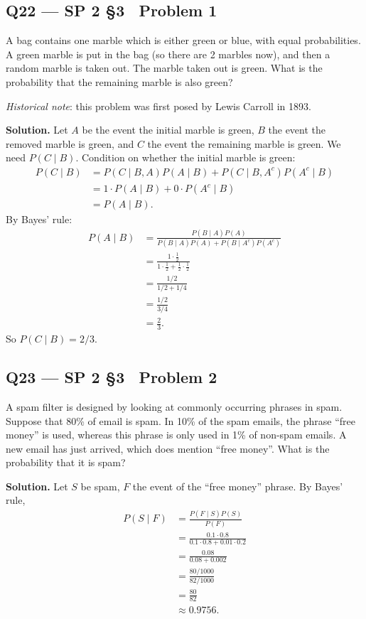 \documentclass[11pt]{article}
\begin{document}
\subsection*{Q22 --- SP 2 \S3 \textperiodcentered\ Problem 1}
\begin{qbox}
A bag contains one marble which is either green or blue, with equal probabilities. A green marble is put in the bag (so there are 2 marbles now), and then a random marble is taken out. The marble taken out is green. What is the probability that the remaining marble is also green?

\textit{Historical note}: this problem was first posed by Lewis Carroll in 1893.
\end{qbox}
\textbf{Solution.} Let $A$ be the event the initial marble is green, $B$ the event the removed marble is green, and $C$ the event the remaining marble is green. We need $P(C\mid B)$. Condition on whether the initial marble is green:
\begin{align*}
P(C\mid B) &= P(C\mid B,A)P(A\mid B) + P(C\mid B,A^c)P(A^c\mid B) \\
&= 1\cdot P(A\mid B) + 0\cdot P(A^c\mid B) \\
&= P(A\mid B).
\end{align*}
By Bayes' rule:
\begin{align*}
P(A\mid B) &= \frac{P(B\mid A)P(A)}{P(B\mid A)P(A) + P(B\mid A^c)P(A^c)} \\
&= \frac{1\cdot \tfrac12}{1\cdot\tfrac12 + \tfrac12\cdot\tfrac12} \\
&= \frac{1/2}{1/2+1/4} \\
&= \frac{1/2}{3/4} \\
&= \frac23.
\end{align*}
So $P(C\mid B) = 2/3$.

\subsection*{Q23 --- SP 2 \S3 \textperiodcentered\ Problem 2}
\begin{qbox}
A spam filter is designed by looking at commonly occurring phrases in spam. Suppose that 80\% of email is spam. In 10\% of the spam emails, the phrase ``free money'' is used, whereas this phrase is only used in 1\% of non-spam emails. A new email has just arrived, which does mention ``free money''. What is the probability that it is spam?
\end{qbox}
\textbf{Solution.} Let $S$ be spam, $F$ the event of the ``free money'' phrase. By Bayes' rule,
\begin{align*}
P(S\mid F) &= \frac{P(F\mid S)P(S)}{P(F)} \\
&= \frac{0.1\cdot 0.8}{0.1\cdot 0.8 + 0.01\cdot 0.2} \\
&= \frac{0.08}{0.08+0.002} \\
&= \frac{80/1000}{82/1000} \\
&= \frac{80}{82} \\
&\approx 0.9756.
\end{align*}
\end{document}
